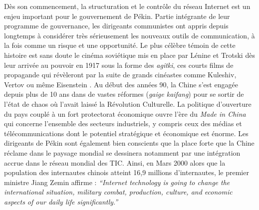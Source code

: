Dès son commencement, la structuration et le contrôle du réseau Internet est un enjeu important pour le gouvernement de Pékin. Partie intégrante de leur programme de gouvernance, les dirigeants communistes ont appris depuis longtemps à considérer très sérieusement les nouveaux outils de communication, à la fois comme un risque et une opportunité. Le plus célèbre témoin de cette histoire est sans doute le cinéma soviétique mis en place par Lénine et Trotski dès leur arrivée au pouvoir en 1917 sous la forme des \textit{agitki}, ces courts films de propagande qui révèleront par la suite de grands cinéastes comme Kuleshiv, Vertov ou même Eisenstein \citep{Mazuy2002}. Au début des années 90, la Chine s’est engagée depuis plus de 10 ans dans de vastes réformes (\textit{gaige kaifang}) pour se sortir de l’état de chaos où l’avait laissé la Révolution Culturelle. La politique d’ouverture du pays couplé à un fort protectorat économique ouvre l’ère du \textit{Made in China} qui concerne l’ensemble des secteurs industriels, y compris ceux des médias et télécommunications dont le potentiel stratégique et économique est énorme. Les dirigeants de Pékin sont également bien conscients que la place forte que la Chine réclame dans le paysage mondial se dessinera notamment par une intégration accrue dans le réseau mondial des TIC. Ainsi, en Mars 2000 alors que la population des internautes chinois atteint 16,9 millions d’internautes, le premier ministre Jiang Zemin affirme : \textit{“Internet technology is going to change the international situation, military combat, production, culture, and economic aspects of our daily life significantly.”} \citep{Foster2000}

